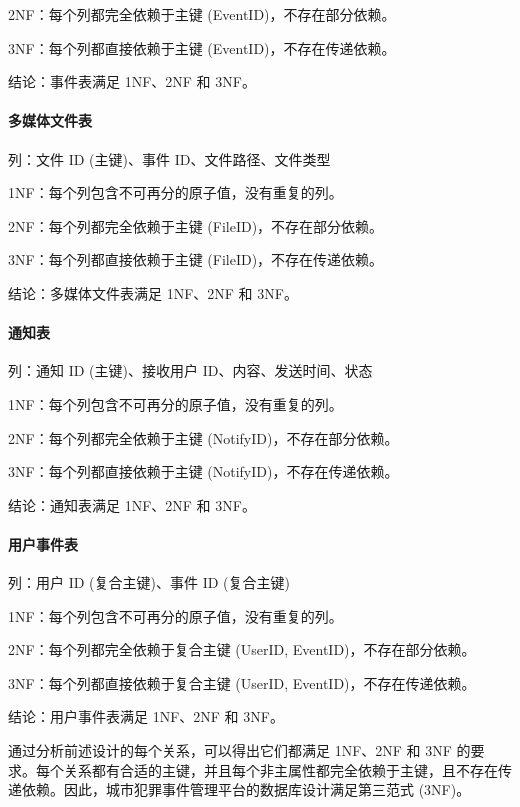 2NF：每个列都完全依赖于主键 (EventID)，不存在部分依赖。

3NF：每个列都直接依赖于主键 (EventID)，不存在传递依赖。

结论：事件表满足 1NF、2NF 和 3NF。

\paragraph{多媒体文件表}

列：文件 ID (主键)、事件 ID、文件路径、文件类型

1NF：每个列包含不可再分的原子值，没有重复的列。

2NF：每个列都完全依赖于主键 (FileID)，不存在部分依赖。

3NF：每个列都直接依赖于主键 (FileID)，不存在传递依赖。

结论：多媒体文件表满足 1NF、2NF 和 3NF。

\paragraph{通知表}

列：通知 ID (主键)、接收用户 ID、内容、发送时间、状态

1NF：每个列包含不可再分的原子值，没有重复的列。

2NF：每个列都完全依赖于主键 (NotifyID)，不存在部分依赖。

3NF：每个列都直接依赖于主键 (NotifyID)，不存在传递依赖。

结论：通知表满足 1NF、2NF 和 3NF。

\paragraph{用户事件表}

列：用户 ID (复合主键)、事件 ID (复合主键)

1NF：每个列包含不可再分的原子值，没有重复的列。

2NF：每个列都完全依赖于复合主键 (UserID, EventID)，不存在部分依赖。

3NF：每个列都直接依赖于复合主键 (UserID, EventID)，不存在传递依赖。

结论：用户事件表满足 1NF、2NF 和 3NF。

通过分析前述设计的每个关系，可以得出它们都满足 1NF、2NF 和 3NF 的要求。每个关系都有合适的主键，并且每个非主属性都完全依赖于主键，且不存在传递依赖。因此，城市犯罪事件管理平台的数据库设计满足第三范式 (3NF)。
